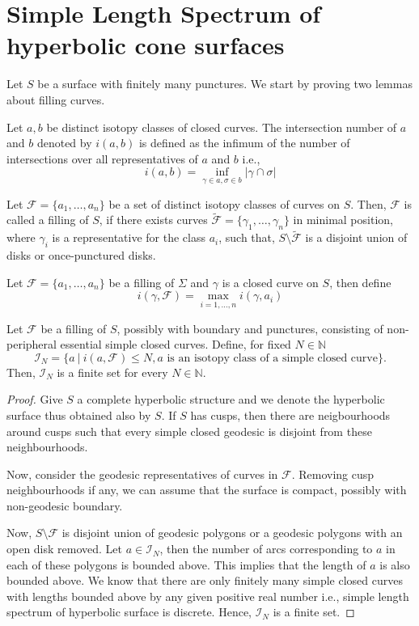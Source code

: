 \section{Simple Length Spectrum of hyperbolic cone surfaces}

Let $S$ be a surface with finitely many punctures. We start by proving two lemmas about filling curves.
\begin{defn}
	Let $a,b$ be distinct isotopy classes of closed curves. The intersection number of $a$ and $b$ denoted by $i(a,b)$ is defined as the infimum of the number of intersections over all representatives of $a$ and $b$ i.e.,
	$$i(a,b) = \inf_{\gamma \in a, \sigma \in b} |\gamma \cap \sigma|$$ 
\end{defn}
\begin{defn} \label{Filling}
		Let $\mathcal{F} = \{a_1, \ldots, a_n\}$ be a set of distinct isotopy classes of curves on $S$. Then, $\mathcal{F}$ is called a filling of $S$, if there exists curves $\tilde{\mathcal{F}} = \{\gamma_1, \ldots, \gamma_n\}$ in minimal position, where $\gamma_i$ is a representative for the class $a_i$, such that, $S \setminus \tilde{\mathcal{F}}$ is a disjoint union of disks or once-punctured disks. 
\end{defn} 

Let $\mathcal{F} =  \{a_1, \ldots, a_n\} $ be a filling of $\Sigma$ and $\gamma$ is a closed curve on $S$, then define
$$i(\gamma, \mathcal{F}) = \max_{i = 1,\ldots, n} i(\gamma, a_i) $$

\begin{lem} \label{lem:FillingLemma}
	Let $\mathcal{F}$ be a filling of $S$, possibly with boundary and punctures, consisting of non-peripheral essential simple closed curves. Define, for fixed $N \in \mathbb{N}$
	$$ \mathcal{I}_N = \{a ~ | ~ i(a,\mathcal{F}) \leq N, a \text{ is an isotopy class of a simple closed curve} \}. $$
	Then, $\mathcal{I}_N$ is a finite set for every $N \in \mathbb{N}$.
\end{lem}

\begin{proof}
	
	Give $S$ a complete hyperbolic structure and we denote the hyperbolic surface thus obtained also by $S$. If $S$ has cusps, then there are neigbourhoods around cusps such that every simple closed geodesic is disjoint from these neighbourhoods.

	Now, consider the geodesic representatives of curves in $\mathcal{F}$. Removing cusp neighbourhoods if any, we can assume that the surface is compact, possibly with non-geodesic boundary. 
	
	Now, $S \setminus \mathcal{F}$ is disjoint union of geodesic polygons or a geodesic polygons with an open disk removed. Let $a \in \mathcal{I}_N$, then the number of arcs corresponding to $a$ in each of these polygons is bounded above. This implies that the length of $a$ is also bounded above. We know that there are only finitely many simple closed curves with lengths bounded above by any given positive real number i.e., simple length spectrum of hyperbolic surface is discrete. Hence, $\mathcal{I}_N$ is a finite set. 
	
\end{proof}

